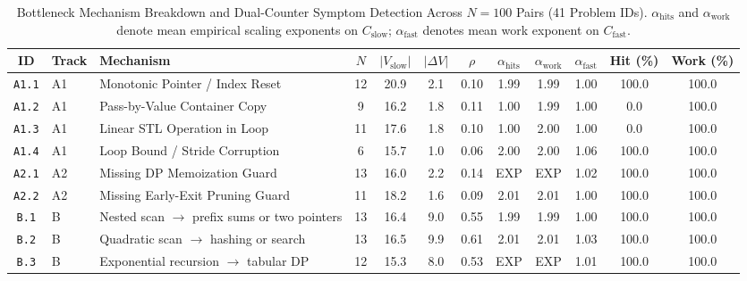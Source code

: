 \begin{table}[t]
\centering
\small
\caption{Bottleneck Mechanism Breakdown and Dual-Counter Symptom Detection Across $N=100$ Pairs (41 Problem IDs). $\alpha_{\text{hits}}$ and $\alpha_{\text{work}}$ denote mean empirical scaling exponents on $C_{\text{slow}}$; $\alpha_{\text{fast}}$ denotes mean work exponent on $C_{\text{fast}}$.}
\label{tab:pilot_mechanisms}
\setlength{\tabcolsep}{3pt}
\begin{tabular}{@{}cllccccccccc@{}}
\toprule
\textbf{ID} & \textbf{Track} & \textbf{Mechanism} & \textbf{$N$} & \textbf{$|V_{\text{slow}}|$} & \textbf{$|\Delta V|$} & \textbf{$\rho$} & \textbf{$\alpha_{\text{hits}}$} & \textbf{$\alpha_{\text{work}}$} & \textbf{$\alpha_{\text{fast}}$} & \textbf{Hit (\%)} & \textbf{Work (\%)} \\
\midrule
\texttt{A1.1} & A1 & Monotonic Pointer / Index Reset & 12 & 20.9 & 2.1 & 0.10 & 1.99 & 1.99 & 1.00 & 100.0 & 100.0 \\
\texttt{A1.2} & A1 & Pass-by-Value Container Copy & 9 & 16.2 & 1.8 & 0.11 & 1.00 & 1.99 & 1.00 & 0.0 & 100.0 \\
\texttt{A1.3} & A1 & Linear STL Operation in Loop & 11 & 17.6 & 1.8 & 0.10 & 1.00 & 2.00 & 1.00 & 0.0 & 100.0 \\
\texttt{A1.4} & A1 & Loop Bound / Stride Corruption & 6 & 15.7 & 1.0 & 0.06 & 2.00 & 2.00 & 1.06 & 100.0 & 100.0 \\
\midrule
\texttt{A2.1} & A2 & Missing DP Memoization Guard & 13 & 16.0 & 2.2 & 0.14 & EXP & EXP & 1.02 & 100.0 & 100.0 \\
\texttt{A2.2} & A2 & Missing Early-Exit Pruning Guard & 11 & 18.2 & 1.6 & 0.09 & 2.01 & 2.01 & 1.00 & 100.0 & 100.0 \\
\midrule
\texttt{B.1} & B & Nested scan $\to$ prefix sums or two pointers & 13 & 16.4 & 9.0 & 0.55 & 1.99 & 1.99 & 1.00 & 100.0 & 100.0 \\
\texttt{B.2} & B & Quadratic scan $\to$ hashing or search & 13 & 16.5 & 9.9 & 0.61 & 2.01 & 2.01 & 1.03 & 100.0 & 100.0 \\
\texttt{B.3} & B & Exponential recursion $\to$ tabular DP & 12 & 15.3 & 8.0 & 0.53 & EXP & EXP & 1.01 & 100.0 & 100.0 \\
\bottomrule
\end{tabular}
\end{table}

